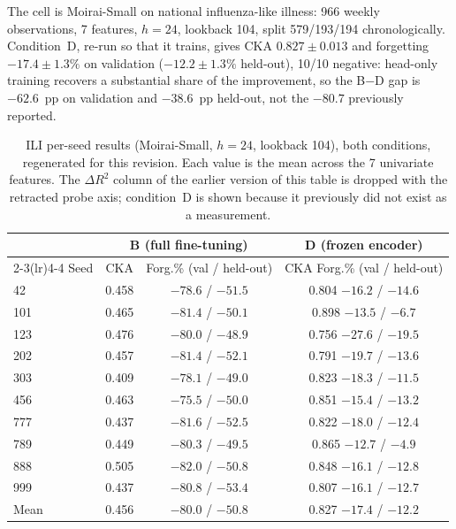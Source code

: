 \documentclass{article}
\begin{document}
The cell is Moirai-Small on national influenza-like illness: 966 weekly observations, 7 features,
$h{=}24$, lookback 104, split 579/193/194 chronologically.
Condition~D, re-run so that it trains, gives CKA $0.827{\pm}0.013$ and forgetting $-17.4{\pm}1.3\%$ on validation ($-12.2{\pm}1.3\%$ held-out), 10/10 negative: head-only training recovers a substantial share of the improvement, so the B$-$D gap is $-62.6$~pp on validation and $-38.6$~pp held-out, not the $-80.7$ previously reported.

\begin{table}[h]
\centering
\caption{ILI per-seed results (Moirai-Small, $h{=}24$, lookback 104), both conditions,
regenerated for this revision. Each value is the mean across the 7 univariate features.
The $\Delta R^2$ column of the earlier version of this table is dropped with the retracted probe
axis; condition~D is shown because it previously did not exist as a measurement.}
\label{tab:iliperseed}
\small
\begin{tabular}{@{}lccc@{}}
\toprule
 & \multicolumn{2}{c}{B (full fine-tuning)} & D (frozen encoder) \\
\cmidrule(lr){2-3}\cmidrule(lr){4-4}
Seed & CKA & Forg.\% (val / held-out) & CKA \quad Forg.\% (val / held-out) \\
\midrule
42  & 0.458 & $-78.6$ / $-51.5$ & 0.804 \quad $-16.2$ / $-14.6$ \\
101 & 0.465 & $-81.4$ / $-50.1$ & 0.898 \quad $-13.5$ / $-6.7$ \\
123 & 0.476 & $-80.0$ / $-48.9$ & 0.756 \quad $-27.6$ / $-19.5$ \\
202 & 0.457 & $-81.4$ / $-52.1$ & 0.791 \quad $-19.7$ / $-13.6$ \\
303 & 0.409 & $-78.1$ / $-49.0$ & 0.823 \quad $-18.3$ / $-11.5$ \\
456 & 0.463 & $-75.5$ / $-50.0$ & 0.851 \quad $-15.4$ / $-13.2$ \\
777 & 0.437 & $-81.6$ / $-52.5$ & 0.822 \quad $-18.0$ / $-12.4$ \\
789 & 0.449 & $-80.3$ / $-49.5$ & 0.865 \quad $-12.7$ / $-4.9$ \\
888 & 0.505 & $-82.0$ / $-50.8$ & 0.848 \quad $-16.1$ / $-12.8$ \\
999 & 0.437 & $-80.8$ / $-53.4$ & 0.807 \quad $-16.1$ / $-12.7$ \\
\midrule
Mean & 0.456 & $-80.0$ / $-50.8$ & 0.827 \quad $-17.4$ / $-12.2$ \\
\bottomrule
\end{tabular}
\end{table}
\end{document}
